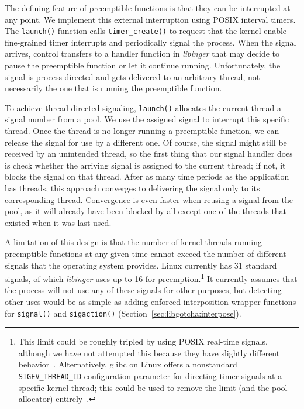 The defining feature of preemptible functions is that they can be interrupted at any
point.  We implement this external interruption using POSIX interval timers.  The
\texttt{launch()} function calls \texttt{timer\_create()} to request that the kernel
enable fine-grained timer interrupts and periodically signal the process.  When the
signal arrives, control transfers to a handler function in \textit{libinger} that may
decide to pause the preemptible function or let it continue running.  Unfortunately,
the signal is process-directed and gets delivered to an arbitrary thread, not
necessarily the one that is running the preemptible function.

To achieve thread-directed signaling, \texttt{launch()} allocates the current thread
a signal number from a pool.  We use the assigned signal to interrupt this specific
thread.  Once the thread is no longer running a preemptible function, we can release
the signal for use by a different one.  Of course, the signal might still be received
by an unintended thread, so the first thing that our signal handler does is check
whether the arriving signal is assigned to the current thread; if not, it blocks the
signal on that thread.  After as many time periods as the application has threads,
this approach converges to delivering the signal only to its corresponding thread.
Convergence is even faster when reusing a signal from the pool, as it will already
have been blocked by all except one of the threads that existed when it was last used.

A limitation of this design is that the number of kernel threads running preemptible
functions at any given time cannot exceed the number of different signals that the
operating system provides.  Linux currently has 31 standard signals, of which
\textit{libinger} uses up to 16 for preemption.\footnote{This limit could be roughly
tripled by using POSIX real-time signals, although we have not attempted this because
they have slightly different behavior~\cite{signal-manpage}.  Alternatively, glibc on
Linux offers a nonstandard \texttt{SIGEV\_THREAD\_ID} configuration parameter for
directing timer signals at a specific kernel thread; this could be used to remove the
limit (and the pool allocator) entirely~\cite{timercreate-manpage}.}  It currently
assumes that the process will not use any of these signals for other purposes, but
detecting other uses would be as simple as adding enforced interposition wrapper
functions for \texttt{signal()} and \texttt{sigaction()}
(Section~\ref{sec:libgotcha:interpose}).

